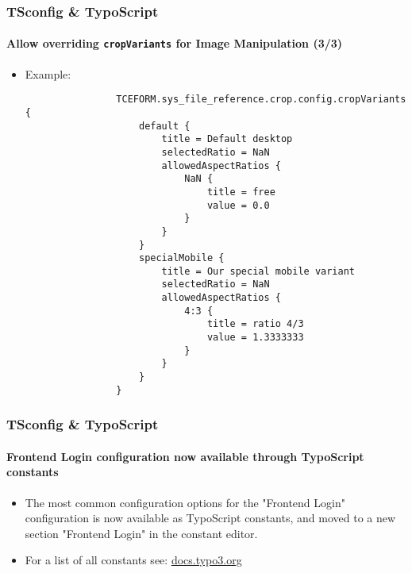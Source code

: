 
\begin{frame}[fragile]
	\frametitle{TSconfig \& TypoScript}
	\framesubtitle{Allow overriding \texttt{cropVariants} for Image Manipulation (3/3)}

	\lstset{basicstyle=\tiny\ttfamily}

	\begin{itemize}
		\item Example:

			\begin{lstlisting}
				TCEFORM.sys_file_reference.crop.config.cropVariants {
				    default {
				        title = Default desktop
				        selectedRatio = NaN
				        allowedAspectRatios {
				            NaN {
				                title = free
				                value = 0.0
				            }
				        }
				    }
				    specialMobile {
				        title = Our special mobile variant
				        selectedRatio = NaN
				        allowedAspectRatios {
				            4:3 {
				                title = ratio 4/3
				                value = 1.3333333
				            }
				        }
				    }
				}
			\end{lstlisting}

	\end{itemize}

\end{frame}



\begin{frame}[fragile]
	\frametitle{TSconfig \& TypoScript}
	\framesubtitle{Frontend Login configuration now available through TypoScript constants}

	\begin{itemize}
		\item The most common configuration options for the "Frontend Login" configuration is now
			available as TypoScript constants, and moved to a new section "Frontend Login" in
			the constant editor.

		\item For a list of all constants see:
			\href{https://docs.typo3.org/typo3cms/extensions/core/8-dev/singlehtml/Index.html#feature-80374-frontend-login-configuration-now-available-through-typoscript-constants}{docs.typo3.org}
	\end{itemize}

\end{frame}

